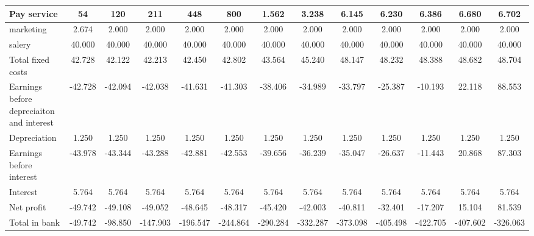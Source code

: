 \begin{tabular}{|p{5cm}|c|c|c|c|c|c|c|c|c|c|c|c|}
\rowcolor[HTML]{C0C0C0} 
Pay service & 54 & 120 & 211 & 448 & 800 & 1.562 & 3.238 & 6.145 & 6.230 & 6.386 & 6.680 & \multicolumn{1}{c|}{\cellcolor[HTML]{C0C0C0}6.702} \\ \hline
marketing & 2.674 & 2.000 & 2.000 & 2.000 & 2.000 & 2.000 & 2.000 & 2.000 & 2.000 & 2.000 & 2.000 & \multicolumn{1}{c|}{2.000} \\ \hline
\rowcolor[HTML]{C0C0C0} 
salery & 40.000 & 40.000 & 40.000 & 40.000 & 40.000 & 40.000 & 40.000 & 40.000 & 40.000 & 40.000 & 40.000 & \multicolumn{1}{c|}{\cellcolor[HTML]{C0C0C0}40.000} \\ \hline \hline
Total fixed costs & 42.728 & 42.122 & 42.213 & 42.450 & 42.802 & 43.564 & 45.240 & 48.147 & 48.232 & 48.388 & 48.682 & \multicolumn{1}{c|}{48.704} \\ \hline \hline
\rowcolor[HTML]{C0C0C0} 
Earnings before depreciaiton and interest & -42.728 & -42.094 & -42.038 & -41.631 & -41.303 & -38.406 & -34.989 & -33.797 & -25.387 & -10.193 & 22.118 & \multicolumn{1}{c|}{\cellcolor[HTML]{C0C0C0}88.553} \\ \hline \hline
Depreciation & 1.250 & 1.250 & 1.250 & 1.250 & 1.250 & 1.250 & 1.250 & 1.250 & 1.250 & 1.250 & 1.250 & \multicolumn{1}{c|}{1.250} \\ \hline
\rowcolor[HTML]{C0C0C0} 
Earnings before interest & -43.978 & -43.344 & -43.288 & -42.881 & -42.553 & -39.656 & -36.239 & -35.047 & -26.637 & -11.443 & 20.868 & \multicolumn{1}{c|}{\cellcolor[HTML]{C0C0C0}87.303} \\ \hline
Interest & 5.764 & 5.764 & 5.764 & 5.764 & 5.764 & 5.764 & 5.764 & 5.764 & 5.764 & 5.764 & 5.764 & \multicolumn{1}{c|}{5.764} \\ \hline \hline
\rowcolor[HTML]{C0C0C0} 
Net profit & -49.742 & -49.108 & -49.052 & -48.645 & -48.317 & -45.420 & -42.003 & -40.811 & -32.401 & -17.207 & 15.104 & \multicolumn{1}{c|}{\cellcolor[HTML]{C0C0C0}81.539} \\ \hline
Total in bank & -49.742 & -98.850 & -147.903 & -196.547 & -244.864 & -290.284 & -332.287 & -373.098 & -405.498 & -422.705 & -407.602 & \multicolumn{1}{c|}{-326.063} \\ \hline
\end{tabular}
